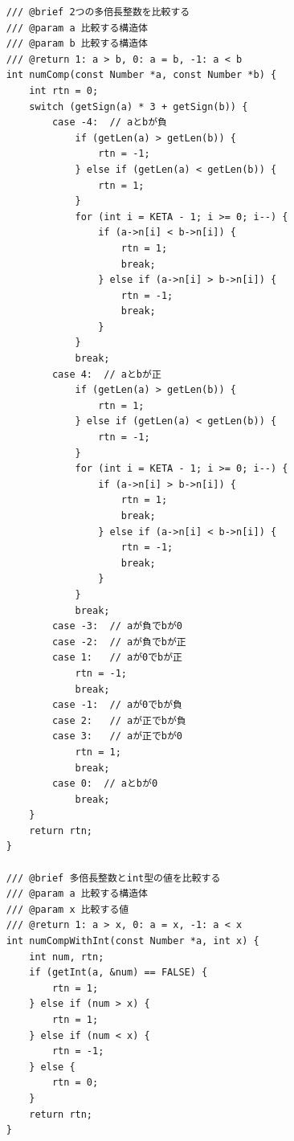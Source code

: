 \documentclass[a4paper,11pt,dvipdfmx]{jsarticle}
\begin{document}
\begin{lstlisting}
    /// @brief 2つの多倍長整数を比較する
    /// @param a 比較する構造体
    /// @param b 比較する構造体
    /// @return 1: a > b, 0: a = b, -1: a < b
    int numComp(const Number *a, const Number *b) {
        int rtn = 0;
        switch (getSign(a) * 3 + getSign(b)) {
            case -4:  // aとbが負
                if (getLen(a) > getLen(b)) {
                    rtn = -1;
                } else if (getLen(a) < getLen(b)) {
                    rtn = 1;
                }
                for (int i = KETA - 1; i >= 0; i--) {
                    if (a->n[i] < b->n[i]) {
                        rtn = 1;
                        break;
                    } else if (a->n[i] > b->n[i]) {
                        rtn = -1;
                        break;
                    }
                }
                break;
            case 4:  // aとbが正
                if (getLen(a) > getLen(b)) {
                    rtn = 1;
                } else if (getLen(a) < getLen(b)) {
                    rtn = -1;
                }
                for (int i = KETA - 1; i >= 0; i--) {
                    if (a->n[i] > b->n[i]) {
                        rtn = 1;
                        break;
                    } else if (a->n[i] < b->n[i]) {
                        rtn = -1;
                        break;
                    }
                }
                break;
            case -3:  // aが負でbが0
            case -2:  // aが負でbが正
            case 1:   // aが0でbが正
                rtn = -1;
                break;
            case -1:  // aが0でbが負
            case 2:   // aが正でbが負
            case 3:   // aが正でbが0
                rtn = 1;
                break;
            case 0:  // aとbが0
                break;
        }
        return rtn;
    }
    
    /// @brief 多倍長整数とint型の値を比較する
    /// @param a 比較する構造体
    /// @param x 比較する値
    /// @return 1: a > x, 0: a = x, -1: a < x
    int numCompWithInt(const Number *a, int x) {
        int num, rtn;
        if (getInt(a, &num) == FALSE) {
            rtn = 1;
        } else if (num > x) {
            rtn = 1;
        } else if (num < x) {
            rtn = -1;
        } else {
            rtn = 0;
        }
        return rtn;
    }
    

\end{lstlisting}
\end{document}
